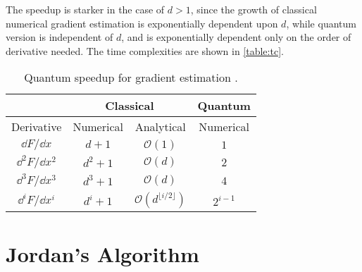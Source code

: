 \documentclass{article}
\begin{document}
The speedup is starker in the case of \(d > 1\), since the growth of classical numerical
gradient estimation is exponentially dependent upon \(d\), while quantum version is
independent of \(d\), and is exponentially dependent only on the order of derivative needed.
The time complexities are shown in  \autoref{table:tc}.

\begin{table}
  \centering
  \begin{tabular}{|c || c | c | c |}
    \hline
                           & \multicolumn{2}{c|}{Classical} & \multicolumn{1}{c|}{Quantum}                               \\
    \hline
    Derivative             & Numerical                      & Analytical                                 & Numerical     \\
    \hline
    \(\dd F / \dd x\)      & \(d + 1\)                      & \(\mathcal{O}(1)\)                         & \(1\)         \\
    \(\dd^2 F / \dd x^2\)  & \(d^2 + 1\)                    & \(\mathcal{O}(d)\)                         & \(2\)         \\
    \(\dd^3 F / \dd x^3 \) & \(d^3 + 1\)                    & \(\mathcal{O}(d)\)                         & \(4\)         \\
    \(\dd^i F / \dd x^i\)  & \(d^i + 1\)                    & \(\mathcal{O}(d^{\lfloor i / 2 \rfloor})\) & \(2^{i - 1}\) \\
    \hline
  \end{tabular}
  \caption{Quantum speedup for gradient estimation \cite{0908.1921}.}
  \label{table:tc}
\end{table}

\section{Jordan's Algorithm}
\end{document}
